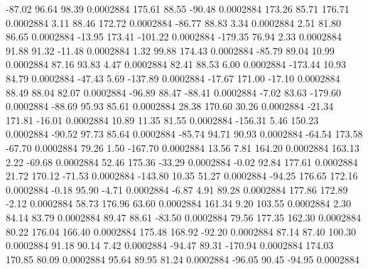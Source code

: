       -87.02       96.64       98.39     0.0002884
      175.61       88.55      -90.48     0.0002884
      173.26       85.71      176.71     0.0002884
        3.11       88.46      172.72     0.0002884
      -86.77       88.83        3.34     0.0002884
        2.51       81.80       86.65     0.0002884
      -13.95      173.41     -101.22     0.0002884
     -179.35       76.94        2.33     0.0002884
       91.88       91.32      -11.48     0.0002884
        1.32       99.88      174.43     0.0002884
      -85.79       89.04       10.99     0.0002884
       87.16       93.83        4.47     0.0002884
       82.41       88.53        6.00     0.0002884
     -173.44       10.93       84.79     0.0002884
      -47.43        5.69     -137.89     0.0002884
      -17.67      171.00      -17.10     0.0002884
       88.49       88.04       82.07     0.0002884
      -96.89       88.47      -88.41     0.0002884
       -7.02       83.63     -179.60     0.0002884
      -88.69       95.93       85.61     0.0002884
       28.38      170.60       30.26     0.0002884
      -21.34      171.81      -16.01     0.0002884
       10.89       11.35       81.55     0.0002884
     -156.31        5.46      150.23     0.0002884
      -90.52       97.73       85.64     0.0002884
      -85.74       94.71       90.93     0.0002884
      -64.54      173.58      -67.70     0.0002884
       79.26        1.50     -167.70     0.0002884
       13.56        7.81      164.20     0.0002884
      163.13        2.22      -69.68     0.0002884
       52.46      175.36      -33.29     0.0002884
       -0.02       92.84      177.61     0.0002884
       21.72      170.12      -71.53     0.0002884
     -143.80       10.35       51.27     0.0002884
      -94.25      176.65      172.16     0.0002884
       -0.18       95.90       -4.71     0.0002884
       -6.87        4.91       89.28     0.0002884
      177.86      172.89       -2.12     0.0002884
       58.73      176.96       63.60     0.0002884
      161.34        9.20      103.55     0.0002884
        2.30       84.14       83.79     0.0002884
       89.47       88.61      -83.50     0.0002884
       79.56      177.35      162.30     0.0002884
       80.22      176.04      166.40     0.0002884
      175.48      168.92      -92.20     0.0002884
       87.14       87.40      100.30     0.0002884
       91.18       90.14        7.42     0.0002884
      -94.47       89.31     -170.94     0.0002884
      174.03      170.85       80.09     0.0002884
       95.64       89.95       81.24     0.0002884
      -96.05       90.45      -94.95     0.0002884
